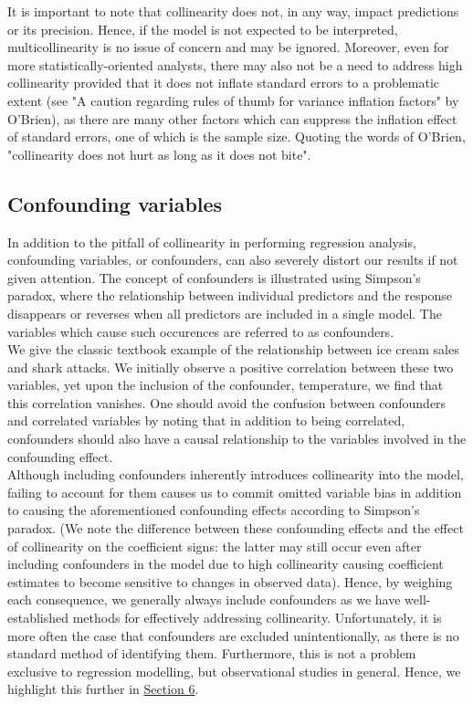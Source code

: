 \documentclass[12pt]{article}
\begin{document}
	It is important to note that collinearity does not, in any way, impact predictions or its precision. Hence, if the model is not expected to be interpreted, multicollinearity is no issue of concern and may be ignored. Moreover, even for more statistically-oriented analysts, there may also not be a need to address high collinearity provided that it does not inflate standard errors to a problematic extent (see "A caution regarding rules of thumb for variance inflation factors" by O'Brien), as there are many other factors which can suppress the inflation effect of standard errors, one of which is the sample size. Quoting the words of O'Brien, "collinearity does not hurt as long as it does not bite".
	
	
	
	
	\subsection{Confounding variables}
	
	In addition to the pitfall of collinearity in performing regression analysis, confounding variables, or confounders, can also severely distort our results if not given attention. The concept of confounders is illustrated using Simpson's paradox, where the relationship between individual predictors and the response disappears or reverses when all predictors are included in a single model. The variables which cause such occurences are referred to as confounders.\\
	
	We give the classic textbook example of the relationship between ice cream sales and shark attacks. We initially observe a positive correlation between these two variables, yet upon the inclusion of the confounder, temperature, we find that this correlation vanishes. One should avoid the confusion between confounders and correlated variables by noting that in addition to being correlated, confounders should also have a causal relationship to the variables involved in the confounding effect.\\
	
	Although including confounders inherently introduces collinearity into the model, failing to account for them causes us to commit omitted variable bias in addition to causing the aforementioned confounding effects according to Simpson's paradox. (We note the difference between these confounding effects and the effect of collinearity on the coefficient signs: the latter may still occur even after including confounders in the model due to high collinearity causing coefficient estimates to become sensitive to changes in observed data). Hence, by weighing each consequence, we generally always include confounders as we have well-established methods for effectively addressing collinearity. Unfortunately, it is more often the case that confounders are excluded unintentionally, as there is no standard method of identifying them. Furthermore, this is not a problem exclusive to regression modelling, but observational studies in general. Hence, we highlight this further in \hyperref[sec:future-rec]{Section 6}.
	
\end{document}
